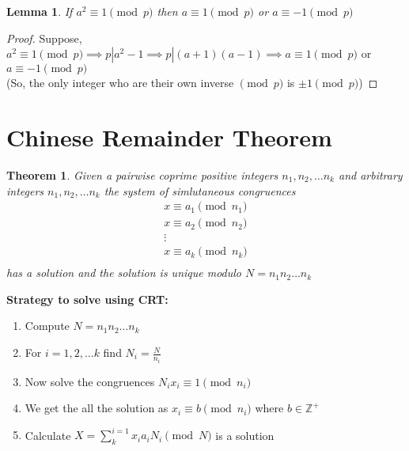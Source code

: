 \documentclass[12pt,a4paper]{article}
\newcommand{\Z}{\mathbb{Z}}
\newtheorem{thm}{Theorem}
\newtheorem{lem}{Lemma}
\begin{document}
\begin{lem}
	If $a^2 \equiv 1 \pmod p$ then $a \equiv 1 \pmod p$ or $a \equiv -1 \pmod p$ 
\end{lem}
\begin{proof}
	Suppose,  $a^2 \equiv 1 \pmod p \implies p|a^2-1 \implies p|(a+1)(a-1) \implies a \equiv 1 \pmod p$ or $a \equiv -1 \pmod p$\\
	(So, the only integer who are their own inverse $\pmod p$ is $\pm 1 \pmod p$)
\end{proof}

\section{Chinese Remainder Theorem}
\begin{thm}
	Given a pairwise coprime positive integers $n_{1},n_{2},\dots n_{k} $ and arbitrary integers $n_{1},n_{2},\dots n_{k} $ the system of simlutaneous congruences 
	\begin{align*}
		x \equiv a_{1} \pmod {n_{1}} \\
		x \equiv a_{2} \pmod {n_{2}} \\
		\vdots \\
		x \equiv a_{k} \pmod {n_{k}} \\
	\end{align*}
	has a solution and the solution is unique modulo $N=n_{1}n_{2}\dots n_{k}$
\end{thm}
\textbf{Strategy to solve using CRT:}\\
\begin{enumerate}
	\item Compute $N=n_{1}n_{2}\dots n_{k}$
	\item For $i=1,2,\dots k$ find $N_{i} = \frac{N}{n_{i}}$
	\item Now solve the congruences $N_{i}x_{i} \equiv 1 \pmod {n_{i}}$
	\item We get the all the solution as $x_{i} \equiv b \pmod {n_{i}}$ where $b \in \Z^{+}$
	\item Calculate $X = \sum_{k}^{i=1} x_{i}a_{i}N_{i} \pmod N$ is a solution 
\end{enumerate}
\end{document}
